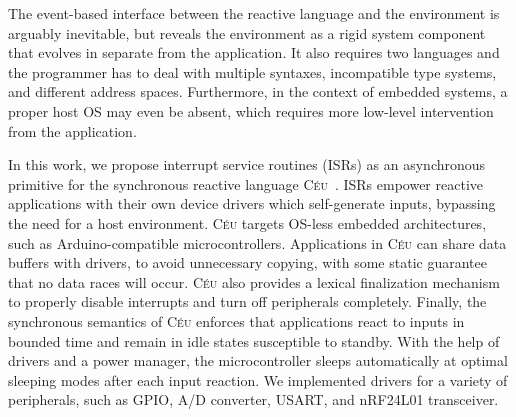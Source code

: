 \documentclass[sigplan,10pt,review,anonymous]{acmart}\settopmatter{printfolios=true,printccs=false,printacmref=false}
\newcommand{\CEU}{\textsc{C\'{e}u}\xspace}
\begin{document}
The event-based interface between the reactive language and the environment is
arguably inevitable,
%
but reveals the environment as a rigid system component
that evolves in separate from the application.
%
It also requires two languages and the programmer has to deal with multiple
syntaxes, incompatible type systems, and different address spaces.
%
Furthermore, in the context of embedded systems, a proper host OS may even be
absent,
which requires more low-level
intervention from the application.

In this work, we propose interrupt service routines (ISRs) as an asynchronous
primitive for the synchronous reactive language \CEU~\cite{ceu.sensys13}.
ISRs empower reactive applications with their own device drivers which
self-generate inputs, bypassing the need for a host environment.
%
\CEU targets OS-less embedded architectures, such as Arduino-compatible
microcontrollers. %
%
%
Applications in \CEU can share data buffers with drivers, to avoid unnecessary copying,
with some static guarantee that no data races will occur.
%
\CEU also provides a lexical finalization mechanism %
to
properly disable interrupts and turn off peripherals completely.
%
Finally, the synchronous semantics of \CEU enforces that applications react
to inputs in bounded time and remain in idle states susceptible to standby.
With the help of drivers and a power manager, the microcontroller
sleeps automatically at optimal sleeping modes after each input reaction.
%
%
We implemented drivers for a variety of peripherals, such as GPIO, A/D
converter, USART, and nRF24L01 transceiver. %
%
\end{document}
